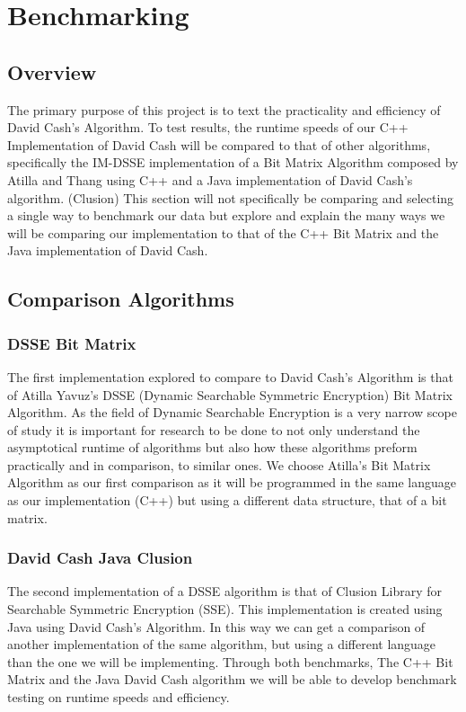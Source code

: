 \section{ Benchmarking }

\subsection{ Overview }
The primary purpose of this project is to text the practicality and efficiency of David Cash’s Algorithm. To test results, the runtime speeds of our C++ Implementation of David Cash will be compared to that of other algorithms, specifically the IM-DSSE implementation of a Bit Matrix Algorithm composed by Atilla and Thang using C++  and a Java implementation of David Cash’s algorithm. (Clusion) This section will not specifically be comparing and selecting a single way to benchmark our data but explore and explain the many ways we will be comparing our implementation to that of the C++ Bit Matrix and the Java implementation of David Cash.

\subsection{ Comparison Algorithms }
\subsubsection{ DSSE Bit Matrix}
The first implementation explored to compare to David Cash’s Algorithm is that of Atilla Yavuz’s DSSE (Dynamic Searchable Symmetric Encryption) Bit Matrix Algorithm. As the field of Dynamic Searchable Encryption is a very narrow scope of study it is important for research to be done to not only understand the asymptotical runtime of algorithms but also how these algorithms preform practically and in comparison, to similar ones. We choose Atilla’s Bit Matrix Algorithm as our first comparison as it will be programmed in the same language as our implementation (C++) but using a different data structure, that of a bit matrix. 
\subsubsection {David Cash Java Clusion}
	The second implementation of a DSSE algorithm is that of Clusion Library for Searchable Symmetric Encryption (SSE). This implementation is created using Java using David Cash’s Algorithm. In this way we can get a comparison of another implementation of the same algorithm, but using a different language than the one we will be implementing. Through both benchmarks, The C++ Bit Matrix and the Java David Cash algorithm we will be able to develop benchmark testing on runtime speeds and efficiency.

